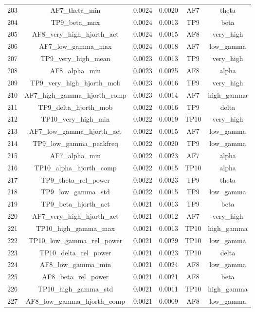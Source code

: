 \begin{table}[hptb]
\begin{table}
\begin{tabular}{cccccc}
203 & AF7_theta_min & 0.0024 & 0.0020 & AF7 & theta \\
204 & TP9_beta_max & 0.0024 & 0.0013 & TP9 & beta \\
205 & AF8_very_high_hjorth_act & 0.0024 & 0.0015 & AF8 & very_high \\
206 & AF7_low_gamma_max & 0.0024 & 0.0018 & AF7 & low_gamma \\
207 & TP9_very_high_mean & 0.0023 & 0.0013 & TP9 & very_high \\
208 & AF8_alpha_min & 0.0023 & 0.0025 & AF8 & alpha \\
209 & TP9_very_high_hjorth_mob & 0.0023 & 0.0016 & TP9 & very_high \\
210 & AF7_high_gamma_hjorth_comp & 0.0023 & 0.0014 & AF7 & high_gamma \\
211 & TP9_delta_hjorth_mob & 0.0022 & 0.0016 & TP9 & delta \\
212 & TP10_very_high_min & 0.0022 & 0.0019 & TP10 & very_high \\
213 & AF7_low_gamma_hjorth_act & 0.0022 & 0.0015 & AF7 & low_gamma \\
214 & TP9_low_gamma_peakfreq & 0.0022 & 0.0020 & TP9 & low_gamma \\
215 & AF7_alpha_min & 0.0022 & 0.0023 & AF7 & alpha \\
216 & TP10_alpha_hjorth_comp & 0.0022 & 0.0015 & TP10 & alpha \\
217 & TP9_theta_rel_power & 0.0022 & 0.0023 & TP9 & theta \\
218 & TP9_low_gamma_std & 0.0022 & 0.0015 & TP9 & low_gamma \\
219 & TP9_beta_hjorth_act & 0.0021 & 0.0013 & TP9 & beta \\
220 & AF7_very_high_hjorth_act & 0.0021 & 0.0012 & AF7 & very_high \\
221 & TP10_high_gamma_max & 0.0021 & 0.0013 & TP10 & high_gamma \\
222 & TP10_low_gamma_rel_power & 0.0021 & 0.0029 & TP10 & low_gamma \\
223 & TP10_delta_rel_power & 0.0021 & 0.0023 & TP10 & delta \\
224 & AF8_low_gamma_min & 0.0021 & 0.0024 & AF8 & low_gamma \\
225 & AF8_beta_rel_power & 0.0021 & 0.0021 & AF8 & beta \\
226 & TP10_high_gamma_std & 0.0021 & 0.0011 & TP10 & high_gamma \\
227 & AF8_low_gamma_hjorth_comp & 0.0021 & 0.0009 & AF8 & low_gamma \\

\end{tabular}
\end{table}
\end{table}
